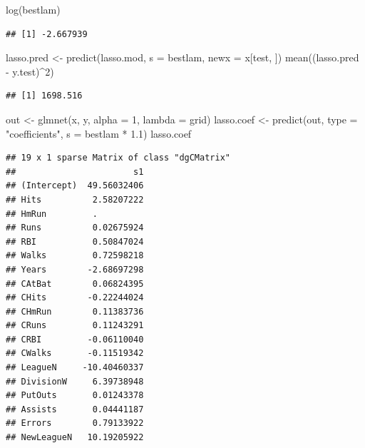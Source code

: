 \documentclass[
  12pt,
]{book}
\newenvironment{Shaded}{\begin{snugshade}}{\end{snugshade}}
\newcommand{\AttributeTok}[1]{\textcolor[rgb]{0.77,0.63,0.00}{#1}}
\newcommand{\DecValTok}[1]{\textcolor[rgb]{0.00,0.00,0.81}{#1}}
\newcommand{\FloatTok}[1]{\textcolor[rgb]{0.00,0.00,0.81}{#1}}
\newcommand{\FunctionTok}[1]{\textcolor[rgb]{0.00,0.00,0.00}{#1}}
\newcommand{\NormalTok}[1]{#1}
\newcommand{\OtherTok}[1]{\textcolor[rgb]{0.56,0.35,0.01}{#1}}
\newcommand{\SpecialCharTok}[1]{\textcolor[rgb]{0.00,0.00,0.00}{#1}}
\newcommand{\StringTok}[1]{\textcolor[rgb]{0.31,0.60,0.02}{#1}}
\begin{document}
\begin{Shaded}
\begin{Highlighting}[]
\FunctionTok{log}\NormalTok{(bestlam)}
\end{Highlighting}
\end{Shaded}

\begin{verbatim}
## [1] -2.667939
\end{verbatim}

\begin{Shaded}
\begin{Highlighting}[]
\NormalTok{lasso.pred }\OtherTok{\textless{}{-}} \FunctionTok{predict}\NormalTok{(lasso.mod, }\AttributeTok{s =}\NormalTok{ bestlam, }\AttributeTok{newx =}\NormalTok{ x[test,}
\NormalTok{    ])}
\FunctionTok{mean}\NormalTok{((lasso.pred }\SpecialCharTok{{-}}\NormalTok{ y.test)}\SpecialCharTok{\^{}}\DecValTok{2}\NormalTok{)}
\end{Highlighting}
\end{Shaded}

\begin{verbatim}
## [1] 1698.516
\end{verbatim}

\begin{Shaded}
\begin{Highlighting}[]
\NormalTok{out }\OtherTok{\textless{}{-}} \FunctionTok{glmnet}\NormalTok{(x, y, }\AttributeTok{alpha =} \DecValTok{1}\NormalTok{, }\AttributeTok{lambda =}\NormalTok{ grid)}
\NormalTok{lasso.coef }\OtherTok{\textless{}{-}} \FunctionTok{predict}\NormalTok{(out, }\AttributeTok{type =} \StringTok{"coefficients"}\NormalTok{, }\AttributeTok{s =}\NormalTok{ bestlam }\SpecialCharTok{*}
    \FloatTok{1.1}\NormalTok{)}
\NormalTok{lasso.coef}
\end{Highlighting}
\end{Shaded}

\begin{verbatim}
## 19 x 1 sparse Matrix of class "dgCMatrix"
##                       s1
## (Intercept)  49.56032406
## Hits          2.58207222
## HmRun         .         
## Runs          0.02675924
## RBI           0.50847024
## Walks         0.72598218
## Years        -2.68697298
## CAtBat        0.06824395
## CHits        -0.22244024
## CHmRun        0.11383736
## CRuns         0.11243291
## CRBI         -0.06110040
## CWalks       -0.11519342
## LeagueN     -10.40460337
## DivisionW     6.39738948
## PutOuts       0.01243378
## Assists       0.04441187
## Errors        0.79133922
## NewLeagueN   10.19205922
\end{verbatim}
\end{document}
